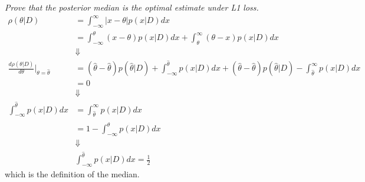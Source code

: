 \begin{example}
	\emph{Prove that the posterior median is the optimal estimate under L1 loss.}
	\begin{equation}
		\begin{split}
			\rho(\theta|D) &= \int_{-\infty}^\infty |x-\theta|p(x|D)dx\\
			&= \int_{-\infty}^{\theta} (x-\theta)p(x|D)dx+\int_{\theta}^\infty (\theta-x)p(x|D)dx\\
			& \Downarrow\\
			\frac{d \rho(\theta|D)}{d\theta}\bigg|_{\theta=\hat{\theta}} &= (\hat{\theta}-\hat{\theta})p(\hat{\theta}|D)+\int_{-\infty}^{\hat{\theta}} p(x|D)dx+(\hat{\theta}-\hat{\theta})p(\hat{\theta}|D)-\int_{\hat{\theta}}^\infty p(x|D)dx\\
			&=0\\
			& \Downarrow\\
			\int_{-\infty}^{\hat{\theta}} p(x|D)dx &= \int_{\hat{\theta}}^\infty p(x|D)dx\\
			&= 1- \int_{-\infty}^{\hat{\theta}} p(x|D)dx\\
			&\Downarrow \\
			& \int_{-\infty}^{\hat{\theta}} p(x|D)dx = \frac{1}{2}
		\end{split}
	\end{equation}
	which is the definition of the median.

\end{example}

